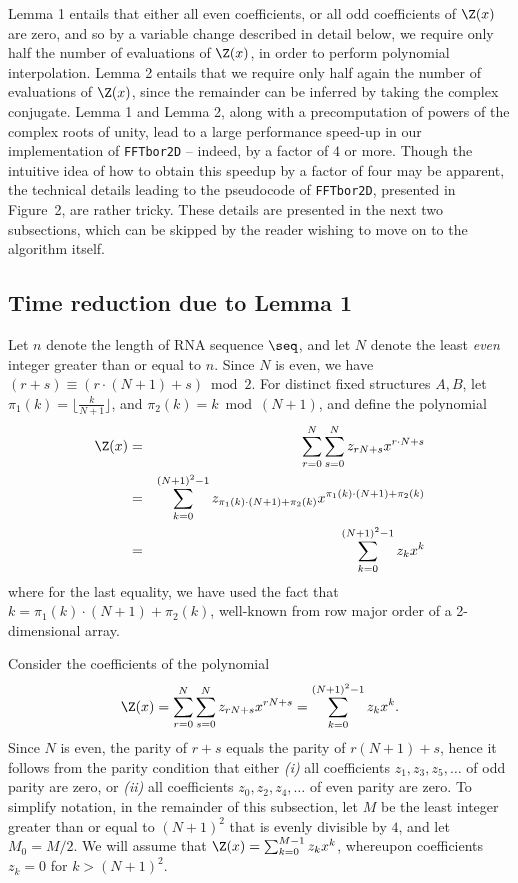 Lemma 1 entails that either all even coefficients, or all odd coefficients
of $\Z(x)$ are zero, and so by a variable change described in detail below,
we require only half the number of evaluations of $\Z(x)$, in order to perform
polynomial interpolation.
Lemma 2 entails that we require only half again the number of evaluations of
$\Z(x)$, since the remainder can be inferred by taking the complex conjugate.
Lemma 1 and Lemma 2, along with a
precomputation of powers of the complex roots of unity, lead to a
large performance speed-up in our implementation of {\tt FFTbor2D} -- indeed,
by a factor of $4$ or more. Though the intuitive idea of how to obtain
this speedup by a factor of four may be apparent, the technical details
leading to the pseudocode of {\tt FFTbor2D}, presented in
Figure~2, are rather tricky. These details
are presented in the next two subsections, which can be skipped by the
reader wishing to move on to the algorithm itself.
\medskip

\subsection{Time reduction due to Lemma 1}
Let $n$ denote the length of RNA sequence $\seq$, and let $N$ denote the
least {\em even} integer greater than or equal to $n$. Since $N$ is even,
we have $(r+s) \equiv (r\cdot(N+1)+s) \bmod 2$. For distinct
fixed structures $A,B$, let
$\pi_1(k) = \lfloor \frac{k}{N+1} \rfloor$, and
$\pi_2(k) = k \bmod (N+1)$, and define the polynomial
\begin{eqnarray*}
\label{eq:polynomialPeter}
\Z(x) &=& \sum_{r=0}^{N} \sum_{s=0}^{N} z_{rN+s} x^{r\cdot N + s}\\
&=&
\sum_{k=0}^{(N+1)^2-1} z_{\pi_1(k)\cdot (N+1) + \pi_2(k)}
x^{\pi_1(k)\cdot (N+1) + \pi_2(k)}\\
&=&
\sum_{k=0}^{(N+1)^2-1} z_k x^k
\end{eqnarray*}
where for the last equality, we have used the fact that
$k = \pi_1(k)\cdot (N+1) + \pi_2(k)$, well-known from
row major order of a 2-dimensional array.

Consider the coefficients of the polynomial
\begin{eqnarray}
\label{eq:yannPolynomialN}
\Z(x) = \sum_{r=0}^{N} \sum_{s=0}^{N} z_{rN+s} x^{rN+s}
= \sum_{k=0}^{(N+1)^2-1} z_k x^k.
\end{eqnarray}
Since $N$ is even, the parity of $r+s$ equals the parity of
$r(N+1)+s$, hence  it follows from the parity condition that either
{\em (i)} all coefficients $z_1,z_3,z_5,\ldots$ of odd parity are zero,
or {\em (ii)} all coefficients $z_0,z_2,z_4,\ldots$ of even parity are zero.
To simplify notation, in the remainder of this subsection, let $M$ be
the least integer greater than or equal to $(N+1)^2$ that is evenly divisible
by $4$, and let $M_0=M/2$. We will assume that $\Z(x) = \sum_{k=0}^{M-1}
z_k x^k$, whereupon coefficients $z_k=0$ for $k>(N+1)^2$.
\smallskip

